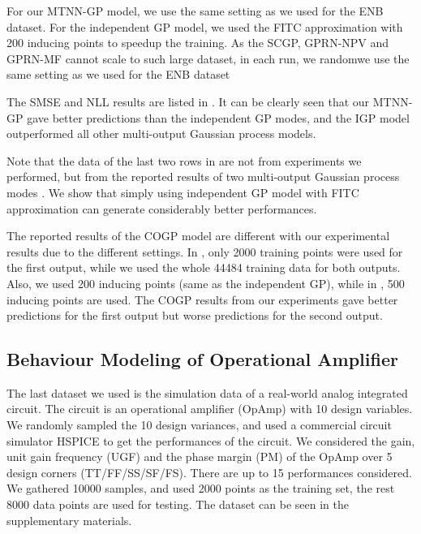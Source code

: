 For our MTNN-GP model, we use the same setting as we used for the ENB dataset. For the independent GP model, we used the FITC approximation with 200 inducing points to speedup the training. As the SCGP, GPRN-NPV and GPRN-MF cannot scale to such large dataset, in each run, we randomwe use the same setting as we used for the ENB dataset

The SMSE and NLL results are listed in . It can be clearly seen that our MTNN-GP gave better predictions than the independent GP modes, and the IGP model outperformed all other multi-output Gaussian process models.

Note that the data of the last two rows in  are not from experiments we performed, but from the reported results of two multi-output Gaussian process modes \cite{nguyen2014collaborative, NIPS2015_5665}. We show that simply using independent GP model with FITC approximation can generate considerably better performances.

The reported results of the COGP model are different with our experimental results due to the different settings. In \cite{nguyen2014collaborative}, only 2000 training points were used for the first output, while we used the whole 44484 training data for both outputs. Also, we used 200 inducing points (same as the independent GP), while in \cite{nguyen2014collaborative}, 500 inducing points are used. The COGP results from our experiments gave better predictions for the first output but worse predictions for the second output.




\subsection{Behaviour Modeling of Operational Amplifier}\label{sec:dac14}


The last dataset we used is the simulation data of a real-world analog integrated circuit. The circuit is an operational amplifier (OpAmp) with 10 design variables. We randomly sampled the 10 design variances, and used a commercial circuit simulator HSPICE to get the performances of the circuit. We considered the gain, unit gain frequency (UGF) and the phase margin (PM) of the OpAmp over 5 design corners (TT/FF/SS/SF/FS). There are up to 15 performances considered. We gathered 10000 samples, and used 2000 points as the training set, the rest 8000 data points are used for testing. The dataset can be seen in the supplementary materials.


